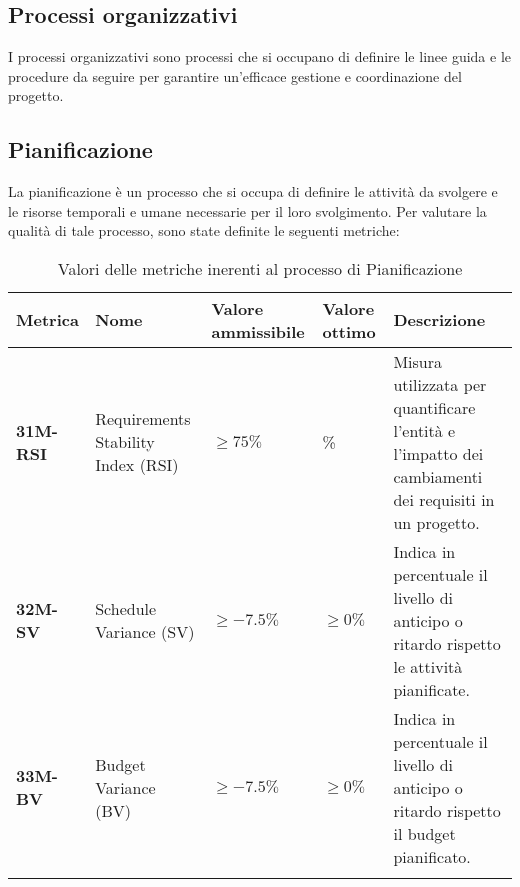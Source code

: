 \subsection{Processi organizzativi}
I processi organizzativi sono processi che si occupano di definire le linee guida e le procedure da seguire per garantire
un'efficace gestione e coordinazione del progetto.
\subsection{Pianificazione}
La pianificazione è un processo che si occupa di definire le attività da svolgere e le risorse temporali e umane necessarie
per il loro svolgimento. Per valutare la qualità di tale processo, sono state definite le seguenti metriche:

\begin{longtable}{|>{\centering\arraybackslash}p{}|>{\centering\arraybackslash}p{}|>{\centering\arraybackslash}p{}|>{\centering\arraybackslash}p{}|>{\centering\arraybackslash}p{}|}
	\hline
	\textbf{Metrica} & \textbf{Nome}                      & \textbf{Valore ammissibile} & \textbf{Valore ottimo} & \textbf{Descrizione}                                                                                  \\
	\hline
	\endfirsthead
	\hline
	\textbf{31M-RSI} & Requirements Stability Index (RSI) & $\geq 75\% $                & 100\%                  & Misura utilizzata per quantificare l’entità e l’impatto dei cambiamenti dei requisiti in un progetto. \\
	\hline
	\textbf{32M-SV}  & Schedule Variance (SV)             & $\geq -7.5\%$               & $\geq 0\%$             & Indica in percentuale il livello di anticipo o ritardo rispetto le attività pianificate.              \\
	\hline
	\textbf{33M-BV}  & Budget Variance (BV)               & $\geq -7.5\%$               & $\geq 0\%$             & Indica in percentuale il livello di anticipo o ritardo rispetto il budget pianificato.                \\
	\hline
	\caption{Valori delle metriche inerenti al processo di Pianificazione}
	\label{table:11}
\end{longtable}












